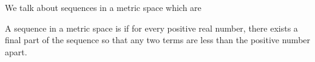 

We talk about sequences in
a metric space which are


A sequence in a metric space
is  if
for every positive real number,
there exists a final
part of the sequence so that
any two terms are less than the
positive number apart.
